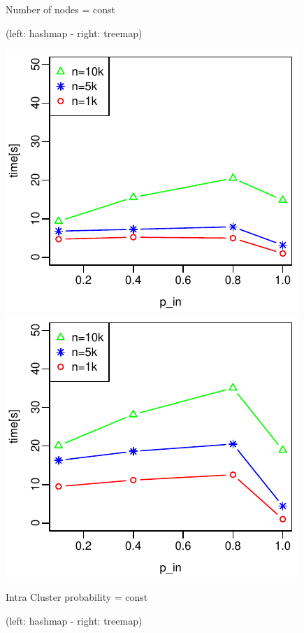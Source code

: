 \documentclass{article}
\begin{document}
 
Number of nodes = const

(left: hashmap - right: treemap)

\includegraphics{test_series_n_const_hashmap.pdf}
\includegraphics{test_series_n_const_treemap.pdf}

Intra Cluster probability = const

(left: hashmap - right: treemap)
\end{document}
